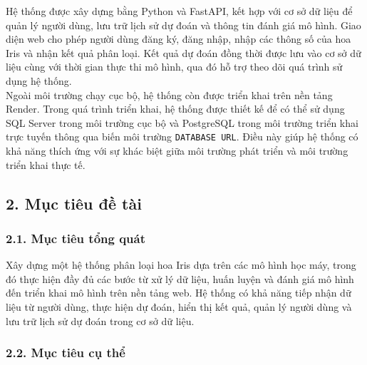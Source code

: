 \documentclass[14pt]{extarticle}
\begin{document}
		 \noindent Hệ thống được xây dựng bằng Python và FastAPI, kết hợp với cơ sở dữ liệu để quản lý người dùng, lưu trữ lịch sử dự đoán và thông tin đánh giá mô hình. Giao diện web cho phép người dùng đăng ký, đăng nhập, nhập các thông số của hoa Iris và nhận kết quả phân loại. Kết quả dự đoán đồng thời được lưu vào cơ sở dữ liệu cùng với thời gian thực thi mô hình, qua đó hỗ trợ theo dõi quá trình sử dụng hệ thống.\\
		 
		 \noindent Ngoài môi trường chạy cục bộ, hệ thống còn được triển khai trên nền tảng Render. Trong quá trình triển khai, hệ thống được thiết kế để có thể sử dụng SQL Server trong môi trường cục bộ và PostgreSQL trong môi trường triển khai trực tuyến thông qua biến môi trường \texttt{DATABASE URL}. Điều này giúp hệ thống có khả năng thích ứng với sự khác biệt giữa môi trường phát triển và môi trường triển khai thực tế.\\
		 
\subsection*{2. Mục tiêu đề tài}

\subsubsection*{2.1. Mục tiêu tổng quát}
		 \noindent Xây dựng một hệ thống phân loại hoa Iris dựa trên các mô hình học máy, trong đó thực hiện đầy đủ các bước từ xử lý dữ liệu, huấn luyện và đánh giá mô hình đến triển khai mô hình trên nền tảng web. Hệ thống có khả năng tiếp nhận dữ liệu từ người dùng, thực hiện dự đoán, hiển thị kết quả, quản lý người dùng và lưu trữ lịch sử dự đoán trong cơ sở dữ liệu.\\
		 
\subsubsection*{2.2. Mục tiêu cụ thể}
\end{document}
